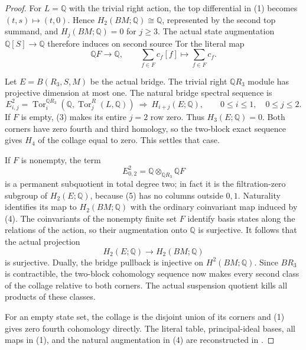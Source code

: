 \begin{proof}
For $L=\mathbb Q$ with the trivial right action, the top
differential in (1) becomes $(t,s)\mapsto(t,0)$.
Hence $H_2(BM;\mathbb Q)\cong\mathbb Q$, represented by the
second top summand, and $H_j(BM;\mathbb Q)=0$ for $j\ge3$.
The actual state augmentation $\mathbb Q[S]\to\mathbb Q$
therefore induces on second source Tor the literal map
\[
 \mathbb QF\longrightarrow\mathbb Q,
 \qquad \sum_{f\in F}c_f[f]\longmapsto\sum_{f\in F}c_f.       \tag{4}
\]

Let $E=B(R_3,S,M)$ be the actual bridge.
The trivial right $\mathbb QR_3$ module has projective dimension
at most one.  The natural bridge spectral sequence is
\[
 E^2_{i,j}=\operatorname{Tor}^{\mathbb QR_3}_i
    (\mathbb Q,\operatorname{Tor}^R_j(L,\mathbb Q))
 \ \Longrightarrow\ H_{i+j}(E;\mathbb Q),
 \qquad 0\le i\le1,\quad0\le j\le2.                         \tag{5}
\]
If $F$ is empty, (3) makes its entire $j=2$ row zero.
Thus $H_3(E;\mathbb Q)=0$.
Both corners have zero fourth and third homology, so the
two-block exact sequence gives $H_4$ of the collage equal
to zero.  This settles that case.

If $F$ is nonempty, the term
\[
 E^2_{0,2}=\mathbb Q\otimes_{\mathbb QR_3}\mathbb QF
\]
is a permanent subquotient in total degree two; in fact it
is the filtration-zero subgroup of $H_2(E;\mathbb Q)$,
because (5) has no columns outside $0,1$.
Naturality identifies its map to $H_2(BM;\mathbb Q)$ with
the ordinary coinvariant map induced by (4).
The coinvariants of the nonempty finite set $F$ identify
basis states along the relations of the action, so their
augmentation onto $\mathbb Q$ is surjective.
It follows that the actual projection
\[
 H_2(E;\mathbb Q)\longrightarrow H_2(BM;\mathbb Q)
\]
is surjective.  Dually, the bridge pullback is injective
on $H^2(BM;\mathbb Q)$.
Since $BR_3$ is contractible, the two-block cohomology
sequence now makes every second class of the collage
relative to both corners.  The actual suspension quotient
kills all products of these classes.

For an empty state set, the collage is the disjoint union
of its corners and (1) gives zero fourth cohomology directly.
The literal table, principal-ideal bases, all maps in (1),
and the natural augmentation in (4) are reconstructed in
.
\end{proof}
